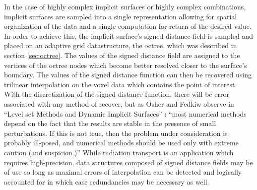 \documentclass[12pt, a4paper]{article}
\begin{document}
In the case of highly complex implicit surfaces or highly complex combinations, implicit surfaces are sampled into a single representation allowing for spatial organization of the data and a single computation for return of the desired value. In order to achieve this, the implicit surface's signed distance field is sampled and placed on an adaptive grid datastructure, the octree, which was described in section \ref{sec:octree}. The values of the signed distance field are assigned to the vertices of the octree nodes which become better resolved closer to the surface's boundary. The values of the signed distance function can then be recovered using trilinear interpolation on the voxel data which contains the point of interest. With the discretization of the signed distance function, there will be error associated with any method of recover, but as Osher and Fedkiw observe in ``Level set Methods and Dynamic Implicit Surfaces'' \cite{Osher_2003}: ``most numerical methods depend on the fact that the results are stable in the presence of small perturbations. If this is not true, then the problem under consideration is probably ill-posed, and numerical methods should be used only with extreme caution (and suspicion.)'' While radiation transport is an application which requires high-precision, data structures composed of signed distance fields may be of use so long as maximal errors of interpolation can be detected and logically accounted for in which case redundancies may be necessary as well.








\end{document}
